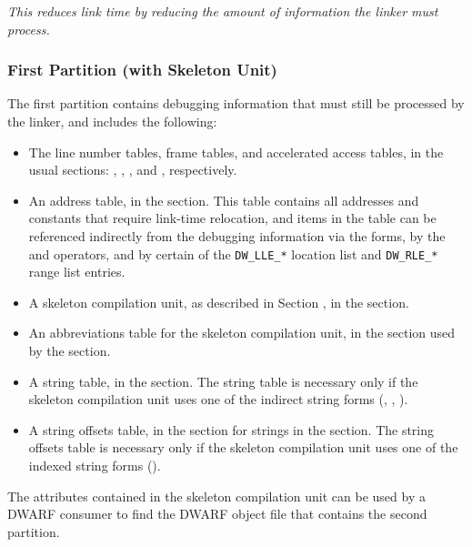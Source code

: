 \textit{This reduces link time by reducing the amount of information
the linker must process.}

\subsubsection{First Partition (with Skeleton Unit)}
\label{datarep:firstpartition}
The first partition contains
debugging information that must still be processed by the linker,
and includes the following:
\begin{itemize}
\item
The line number tables, frame tables, and
accelerated access tables, in the usual sections:
\dotdebugline, \dotdebuglinestr, 
\dotdebugframe, \dotdebugnames{} and \dotdebugaranges,
respectively.
\item
An address table, in the \dotdebugaddr{} section. This table
contains all addresses and constants that require
link-time relocation, and items in the table can be
referenced indirectly from the debugging information via
the \DWFORMaddrxXNand{} forms, 
by the \DWOPaddrx{} and \DWOPconstx{} operators, and
by certain of the \texttt{DW\_LLE\_*} location list
and \texttt{DW\_RLE\_*} range list entries.
\item
A skeleton compilation unit, as described in Section
, 
in the \dotdebuginfo{} section.
\item
An abbreviations table for the skeleton compilation unit,
in the \dotdebugabbrev{} section
used by the \dotdebuginfo{} section.

\item
A string table, in the \dotdebugstr{} section. The string
table is necessary only if the skeleton compilation unit
uses one of the indirect string forms (\DWFORMstrp{},
\bb
\DWFORMstrpeight{},
\eb 
\DWFORMstrxXNor).

\item
A string offsets table, in the \dotdebugstroffsets{}
section for strings in the \dotdebugstr{} section. 
The string offsets table is necessary only if
the skeleton compilation unit uses 
one of the indexed string forms (\DWFORMstrxXN).
\end{itemize}
The attributes contained in the skeleton compilation
unit can be used by a DWARF consumer to find the 
DWARF object file that contains the second partition.

